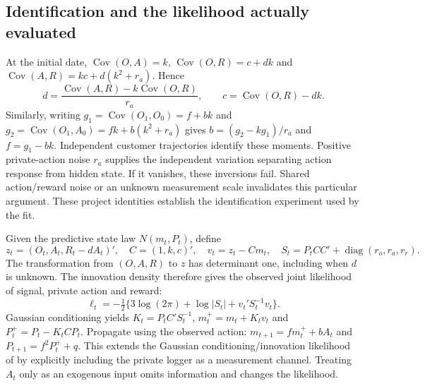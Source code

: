 \subsection{Identification and the likelihood actually evaluated}
At the initial date, $\operatorname{Cov}(O,A)=k$,
$\operatorname{Cov}(O,R)=c+dk$ and
$\operatorname{Cov}(A,R)=kc+d(k^2+r_a)$. Hence
\[
 d=\frac{\operatorname{Cov}(A,R)-k\operatorname{Cov}(O,R)}{r_a},
 \qquad c=\operatorname{Cov}(O,R)-dk.
\]
Similarly, writing $g_1=\operatorname{Cov}(O_1,O_0)=f+bk$ and
$g_2=\operatorname{Cov}(O_1,A_0)=fk+b(k^2+r_a)$ gives
$b=(g_2-kg_1)/r_a$ and $f=g_1-bk$. Independent customer trajectories
identify these moments. Positive private-action noise $r_a$ supplies the
independent variation separating action response from hidden state. If it
vanishes, these inversions fail. Shared action/reward noise or an unknown
measurement scale invalidates this particular argument. These project
identities establish the identification experiment used by the fit.

Given the predictive state law $N(m_t,P_t)$, define
\[
 z_t=(O_t,A_t,R_t-dA_t)',\quad C=(1,k,c)',\quad
 v_t=z_t-Cm_t,\quad S_t=P_tCC'+\operatorname{diag}(r_o,r_a,r_r).
\]
The transformation from $(O,A,R)$ to $z$ has determinant one, including
when $d$ is unknown. The innovation density therefore gives the observed
joint likelihood of signal, private action and reward:
\[
 \ell_t=-\tfrac12\{3\log(2\pi)+\log|S_t|+v_t'S_t^{-1}v_t\}.
\]
Gaussian conditioning yields $K_t=P_tC'S_t^{-1}$,
$m_t^+=m_t+K_tv_t$ and $P_t^+=P_t-K_tCP_t$. Propagate using the observed
action: $m_{t+1}=fm_t^++bA_t$ and $P_{t+1}=f^2P_t^++q$.
This extends the Gaussian conditioning/innovation likelihood of
\citet[Theorems 4.2 and 12.1]{sarkka2013} by explicitly including the
private logger as a measurement channel. Treating $A_t$ only as an exogenous
input omits information and changes the likelihood.

